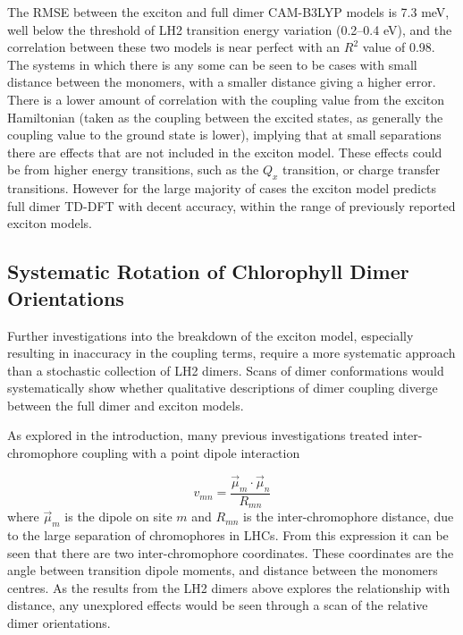 The RMSE between the exciton and full dimer CAM-B3LYP models is 7.3 meV, well below
the threshold of LH2 \Qy transition energy variation (0.2--0.4 eV), and the correlation
between these two models is near perfect with an $R^2$ value of 0.98. The systems 
in which there is any some can be seen to be cases with small distance between the
monomers, with a smaller distance giving a higher error. There is a lower amount
of correlation with the coupling value from the exciton Hamiltonian (taken as the
coupling between the excited states, as generally the coupling value to the ground
state is lower), implying that at small separations there are effects that are not
included in the exciton model. These effects could be from higher energy transitions, 
such as the $Q_x$ transition, or charge transfer transitions. However for the large 
majority of cases the exciton model predicts full dimer TD-DFT with decent accuracy, 
within the range of previously reported exciton models.

\subsection{Systematic Rotation of Chlorophyll Dimer Orientations}
\label{subsec:rotation}

Further investigations into the breakdown of the exciton model, especially resulting
in inaccuracy in the coupling terms, require a more systematic approach than a stochastic
collection of LH2 dimers. Scans of dimer conformations would systematically show 
whether qualitative descriptions of dimer coupling diverge between the full dimer 
and exciton models. 

As explored in the introduction, many previous investigations treated inter-chromophore
coupling with a point dipole interaction

\begin{equation}
    v_{mn} = \frac{\vec{\mu}_m \cdot \vec{\mu}_n}{R_{mn}}
\end{equation}
%
where $\vec{\mu}_m$ is the dipole on site $m$ and $R_{mn}$ is the inter-chromophore
distance, due to the large separation of chromophores in LHCs. From this expression
it can be seen that there are two inter-chromophore coordinates. These coordinates 
are the angle between transition dipole moments, and distance between the monomers centres.
As the results from the LH2 dimers above explores the relationship with distance,
any unexplored effects would be seen through a scan of the relative dimer orientations.

